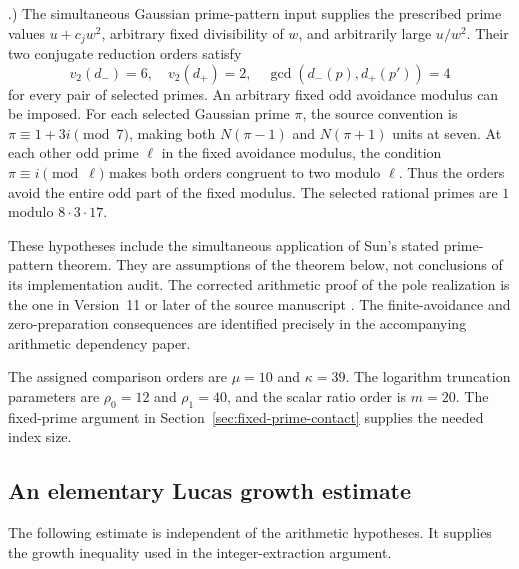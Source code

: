 \documentclass[11pt,a4paper]{article}
\theoremstyle{definition}
\theoremstyle{remark}
\begin{document}
\begin{enumerate}
      \cite[Theorem 4.1]{Sun2026Rational86}.)
      The simultaneous Gaussian prime-pattern input supplies the
      prescribed prime values $u+c_jw^2$, arbitrary fixed divisibility
      of $w$, and arbitrarily large $u/w^2$.  Their two conjugate
      reduction orders satisfy
\[
 v_2(d_-)=6,\quad v_2(d_+)=2,\quad
 \gcd(d_-(p),d_+(p'))=4
\]
      for every pair of selected primes.  An arbitrary fixed odd
      avoidance modulus can be imposed.  For each selected Gaussian
      prime $\pi$, the source convention is
      $\pi\equiv1+3i\pmod7$, making both $N(\pi-1)$ and
      $N(\pi+1)$ units at seven.  At each other odd prime $\ell$
      in the fixed avoidance modulus, the condition
      $\pi\equiv i\pmod\ell$ makes both orders congruent to two
      modulo $\ell$.  Thus the orders avoid the entire odd part
      of the fixed modulus.  The selected rational primes are $1$
      modulo $8\cdot3\cdot17$.
\end{enumerate}
These hypotheses include the simultaneous application of Sun's stated
prime-pattern theorem.  They are assumptions of the theorem below,
not conclusions of its implementation audit.
The corrected arithmetic proof of the pole realization is the one
in Version~11 or later of the source manuscript \cite{RepositoryV11}.
The finite-avoidance and zero-preparation consequences are identified
precisely in the accompanying arithmetic dependency paper.

The assigned comparison orders are $\mu=10$ and $\kappa=39$.
The logarithm truncation parameters are $\rho_0=12$ and $\rho_1=40$,
and the scalar ratio order is $m=20$. The fixed-prime argument in
Section~\ref{sec:fixed-prime-contact} supplies the needed index size.

\subsection{An elementary Lucas growth estimate}

The following estimate is independent of the arithmetic hypotheses.
It supplies the growth inequality used in the integer-extraction argument.
\end{document}
